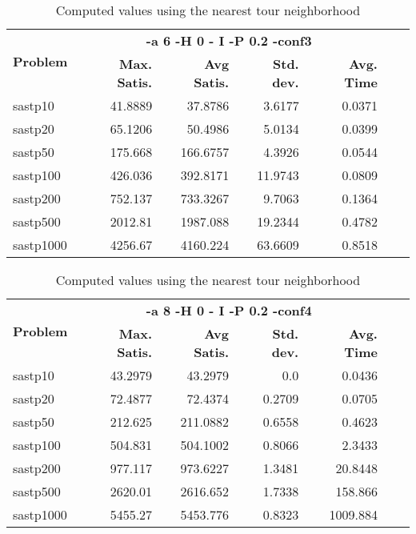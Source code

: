 \documentclass{article}
\begin{document}
\begin{table}[b!]
  \vspace{-6mm}%
  \caption{Computed values using the nearest tour neighborhood}
  \label{tab:NearestTour}
  \setlength{\tabcolsep}{1.4mm}
  \centering
  \begin{tabular}{lrrrrrr}
   \multirow{2}{*}{\bfseries Problem} &
      \multicolumn{4}{c}{\bfseries -a 6 -H 0 - I -P 0.2 -conf3 } \\
    &
    \bfseries Max. Satis. &
    \bfseries Avg Satis. &
    \bfseries Std. dev. &
    \bfseries Avg. Time 
    \\\hline
    sastp10 & 41.8889 & 37.8786 & 3.6177 & 0.0371 \\ 
sastp20 & 65.1206 & 50.4986 & 5.0134 & 0.0399 \\ 
sastp50 & 175.668 & 166.6757 & 4.3926 & 0.0544 \\ 
sastp100 & 426.036 & 392.8171 & 11.9743 & 0.0809 \\ 
sastp200 & 752.137 & 733.3267 & 9.7063 & 0.1364 \\ 
sastp500 & 2012.81 & 1987.088 & 19.2344 & 0.4782 \\ 
sastp1000 & 4256.67 & 4160.224 & 63.6609 & 0.8518

    \\\hline
  \end{tabular}

\end{table}


\begin{table}[b!]
  \vspace{-6mm}%
  \caption{Computed values using the nearest tour neighborhood}
  \label{tab:NearestTour}
  \setlength{\tabcolsep}{1.4mm}
  \centering
  \begin{tabular}{lrrrrrr}
   \multirow{2}{*}{\bfseries Problem} &
      \multicolumn{4}{c}{\bfseries -a 8 -H 0 - I -P 0.2 -conf4 } \\
    &
    \bfseries Max. Satis. &
    \bfseries Avg Satis. &
    \bfseries Std. dev. &
    \bfseries Avg. Time 
    \\\hline
sastp10 & 43.2979 & 43.2979 & 0.0 & 0.0436 \\ 
sastp20 & 72.4877 & 72.4374 & 0.2709 & 0.0705 \\ 
sastp50 & 212.625 & 211.0882 & 0.6558 & 0.4623 \\ 
sastp100 & 504.831 & 504.1002 & 0.8066 & 2.3433 \\ 
sastp200 & 977.117 & 973.6227 & 1.3481 & 20.8448 \\ 
sastp500 & 2620.01 & 2616.652 & 1.7338 & 158.866 \\ 
sastp1000 & 5455.27 & 5453.776 & 0.8323 & 1009.884

    \\\hline
  \end{tabular}

\end{table}
\end{document}
